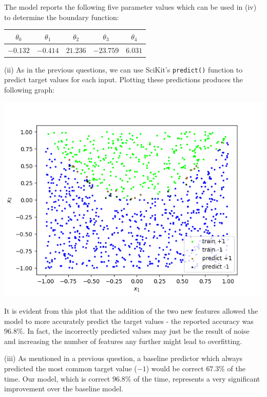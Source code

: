 \documentclass[12pt]{article}
\begin{document}
The model reports the following five parameter values which can be used in (iv) to determine the boundary function:

\begin{center}
    \begin{tabular}{|c|c|c|c|c|}
        \hline
        $\theta_0$ & $\theta_1$ & $\theta_2$ & $\theta_3$ & $\theta_4$\\
        \hline
        $-0.132$ & $-0.414$ & $21.236$ & $-23.759$ & $6.031$ \\
        \hline
    \end{tabular}
\end{center}

\noindent (ii) As in the previous questions, we can use SciKit's \texttt{predict()} function to predict target values for each input. Plotting these predictions produces the following graph:

\begin{center}
    \includegraphics[scale=0.8]{fig_6.png}
\end{center}

It is evident from this plot that the addition of the two new features allowed the model to more accurately predict the target values - the reported accuracy was $96.8\%$. In fact, the incorrectly predicted values may just be the result of noise and increasing the number of features any further might lead to overfitting.

\noindent (iii) As mentioned in a previous question, a baseline predictor which always predicted the most common target value ($-1$) would be correct $67.3\%$ of the time. Our model, which is correct $96.8\%$ of the time, represents a very significant improvement over the baseline model.
\end{document}
